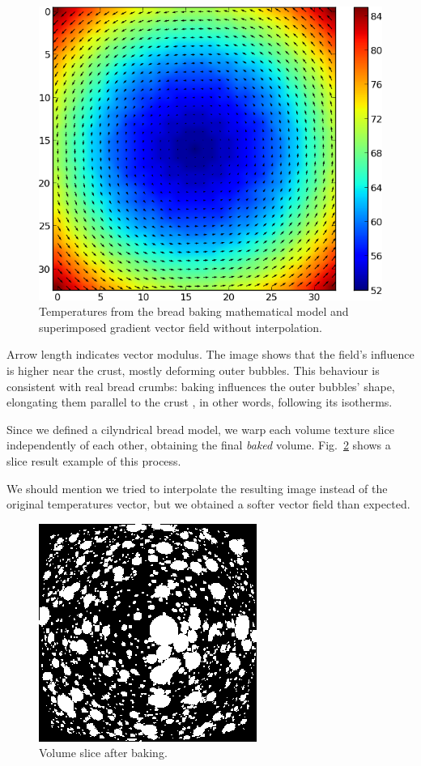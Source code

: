 \documentclass[final,5p,times]{elsarticle}
\begin{document}
{\begin{figure}
\includegraphics[scale=0.58]{vfield.png}
\caption{Temperatures from the bread baking mathematical model and superimposed gradient vector field without interpolation.}
\label{FigBakingVectorField}
\end{figure}

Arrow length indicates vector modulus. The image shows that the field's influence is higher near the crust, mostly deforming outer bubbles. This behaviour is consistent with real bread crumbs: baking influences the outer bubbles' shape, elongating them parallel to the crust \cite{Scanlon2001}, in other words, following its isotherms.

Since we defined a cilyndrical bread model, we warp each volume texture slice independently of each other, obtaining the final {\em baked} volume. Fig.~\ref{FigBaking} shows a slice result example of this process.

We should mention we tried to interpolate the resulting image instead of the original temperatures vector, but we obtained a softer vector field than expected.

\begin{figure}
\includegraphics[scale=0.8]{baking.png}
\caption{Volume slice after baking.}
\label{FigBaking}
\end{figure}

}
\end{document}
